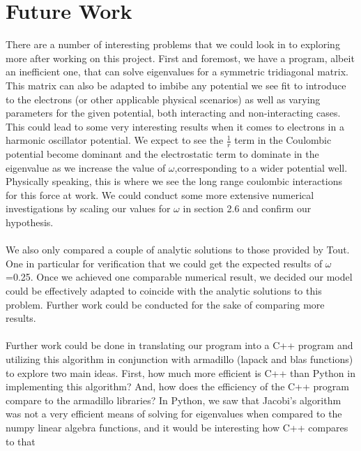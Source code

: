 \documentclass{article}
\begin{document}
\section{Future Work}
There are a number of interesting problems that we could look in to exploring more after working on this project. First and foremost, we have a program, albeit an inefficient one, that can solve eigenvalues for a symmetric tridiagonal matrix. This matrix can also be adapted to imbibe any potential we see fit to introduce to the electrons (or other applicable physical scenarios) as well as varying parameters for the given potential, both interacting and non-interacting cases. This could lead to some very interesting results when it comes to electrons in a harmonic oscillator potential. We expect to see the $\frac{1}{r}$ term in the Coulombic potential become dominant and the electrostatic term to dominate in the eigenvalue as we increase the value of $\omega$,corresponding to a wider potential well. Physically speaking, this is where we see the long range coulombic interactions for this force at work. We could conduct some more extensive numerical investigations by scaling our values for $\omega$  in section 2.6 and confirm our hypothesis. \cite{mortengithub} \\
\\
We also only compared a couple of analytic solutions to those provided by Tout. \cite{journal} One in particular for verification that we could get the expected results of $\omega$=0.25. Once we achieved one comparable numerical result, we decided our model could be effectively adapted to coincide with the analytic solutions to this problem. Further work could be conducted for the sake of comparing more results.\\
\\
Further work could be done in translating our program into a C++ program and utilizing this algorithm in conjunction with armadillo (lapack and blas functions) to explore two main ideas. First, how much more efficient is C++ than Python in implementing this algorithm? And, how does the efficiency of the C++ program compare to the armadillo libraries? In Python, we saw that Jacobi's algorithm was not a very efficient means of solving for eigenvalues when compared to the numpy linear algebra functions, and it would be interesting how C++ compares to that
\end{document}

